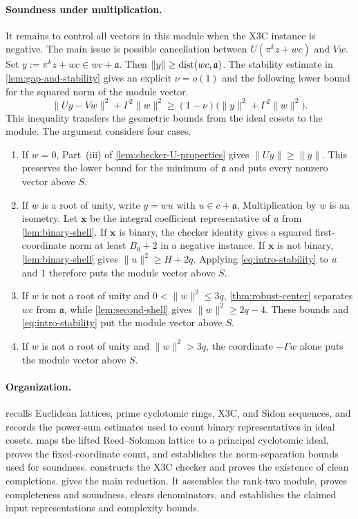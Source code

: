 \paragraph{Soundness under multiplication.}
It remains to control all vectors in this module when the X3C instance is
negative.  The main issue is possible cancellation between
$U(\pi^kz+wc)$ and $Vw$.
 Set $y:=\pi^kz+wc\in wc+\mathfrak a$.
 Then $\|y\|\ge\operatorname{dist}(wc,\mathfrak a)$.
The stability estimate in \cref{lem:gap-and-stability} gives an explicit
$\nu=o(1)$ and the following lower bound for the squared norm of the module
vector.
\begin{equation}
\label{eq:intro-stability}
 \|Uy-Vw\|^2+\Gamma^2\|w\|^2
 \ge(1-\nu)\bigl(\|y\|^2+\Gamma^2\|w\|^2\bigr).
\end{equation}
This inequality transfers the geometric bounds from the ideal cosets to the
module.  The argument considers four cases.
\begin{enumerate}[label=(\roman*),leftmargin=*]
 \item If $w=0$, Part~(iii) of
 \cref{lem:checker-U-properties} gives $\|Uy\|\ge\|y\|$.  This preserves the
 lower bound for the minimum of $\mathfrak a$ and puts every nonzero vector
 above $S$.
 \item If $w$ is a root of unity, write $y=wu$ with
  $u\in c+\mathfrak a$.  Multiplication by $w$ is an isometry.  Let
  $\mathbf x$ be the integral coefficient representative of $u$ from
  \cref{lem:binary-shell}.  If $\mathbf x$ is binary, the checker identity gives
  a squared first-coordinate norm at least $B_0+2$ in a negative instance.
  If $\mathbf x$ is not binary,
  \cref{lem:binary-shell} gives $\|u\|^2\ge H+2q$.  Applying
  \cref{eq:intro-stability} to $u$ and $1$ therefore puts the
  module vector above $S$.
 \item If $w$ is not a root of unity and $0<\|w\|^2\le3q$,
 \cref{thm:robust-center} separates $wc$ from $\mathfrak a$, while
 \cref{lem:second-shell} gives $\|w\|^2\ge2q-4$.  These bounds and
 \cref{eq:intro-stability} put the module vector above $S$.
 \item If $w$ is not a root of unity and $\|w\|^2>3q$, the coordinate
 $-\Gamma w$ alone puts the module vector above $S$.
\end{enumerate}

\paragraph{Organization.}
 recalls Euclidean lattices, prime
cyclotomic rings, X3C, and Sidon sequences, and records the power-sum
estimates used to count binary representatives in ideal cosets.
 maps the lifted Reed--Solomon lattice to a principal
 cyclotomic ideal, proves the fixed-coordinate count, and
 establishes the
norm-separation bounds used for soundness.
 constructs the X3C checker and proves
the existence of clean completions.  
gives the main reduction.  It assembles the rank-two module, proves
completeness and soundness, clears denominators, and establishes the claimed
input representations and complexity bounds.
